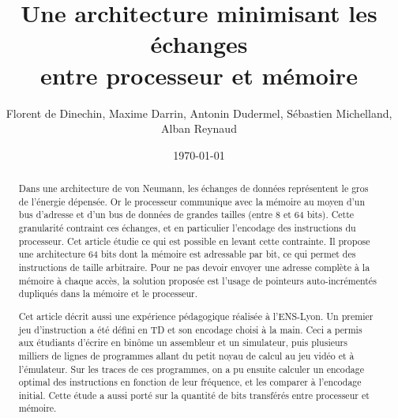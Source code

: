 \documentclass[architecture]{compas2018}
\begin{document}
\title{Une architecture minimisant les échanges\\ entre processeur et mémoire}

\author{\hspace{-1.5ex}%
  Florent de Dinechin, Maxime Darrin, Antonin Dudermel, Sébastien Michelland, Alban Reynaud}

\address{
}

\date{\today}

\maketitle
\sloppy

\begin{abstract}
  Dans une architecture de von Neumann, les échanges de données représentent le gros de l'énergie dépensée.
Or le processeur communique avec la mémoire au moyen d'un bus d'adresse et d'un bus de données de grandes tailles (entre 8 et 64 bits).
Cette granularité contraint ces échanges, et en particulier l'encodage des instructions du processeur.
Cet article étudie ce qui est possible en levant cette contrainte.
Il propose une architecture 64 bits dont la mémoire est adressable par bit, ce qui permet des instructions de taille arbitraire.
Pour ne pas devoir envoyer une adresse complète à la mémoire à chaque accès, la solution proposée est l'usage de pointeurs auto-incrémentés dupliqués dans la mémoire et le processeur.

Cet article décrit aussi une expérience pédagogique réalisée à l'ENS-Lyon.
Un premier jeu d'instruction a été défini en TD et son encodage choisi à la main.
Ceci a permis aux étudiants d'écrire en binôme un assembleur et un simulateur, puis plusieurs milliers de lignes de programmes allant du petit noyau de calcul au jeu vidéo et à l'émulateur.
Sur les traces de ces programmes, on a pu ensuite calculer un encodage optimal des instructions en fonction de leur fréquence, et les comparer à l'encodage initial.
Cette étude a aussi  porté sur la quantité de bits transférés entre processeur et mémoire.

\end{abstract}

\end{document}
